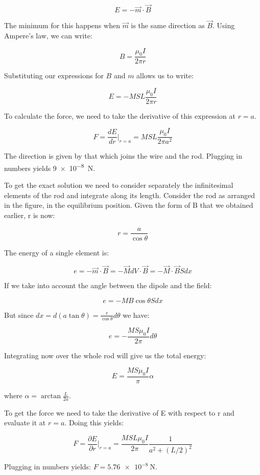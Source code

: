 \[ 
    E = - \vec{m} \cdot \vec{B}
\]

The minimum for this happens when $\vec{m}$ is the same direction as $\vec{B}$.
Using Ampere's law, we can write:

\[ 
    B = \frac{\mu_0 I }{2 \pi r} 
\]

Substituting our expressions for $B$ and $m$ allows us to write:

\[ 
    E = -M S L \frac{\mu_0 I }{2 \pi r} 
\]

To calculate the force, we need to take the derivative of this expression at
$r=a$.

\[ 
    F = \frac{d E}{d r}\big|_{r=a} = MSL \frac{\mu_0 I}{2 \pi a^2}
\]

The direction is given by that which joins the wire and the rod. Plugging in
numbers yields \SI{9e-8}{\newton}.

To get the exact solution we need to consider separately the infinitesimal
elements of the rod and integrate along its length. Consider the rod as
arranged in the figure, in the equilibrium position. Given the form of B that we
obtained earlier, r is now:

\[
    r = \frac{a}{\cos\theta}
\]

The energy of a single element is:

\[ 
    e = - \vec{m}\cdot \vec{B} = -\vec{M} dV \cdot \vec{B} = - \vec{M} \cdot
    \vec{B} S dx
\]

If we take into account the angle between the dipole and the field:

\[ 
    e = -M B \cos\theta S dx 
\]

But since $dx = d(a \tan\theta) = \frac{r}{\cos \theta}d \theta$ we have:

\[ 
    e = - \frac{M S \mu_0 I}{2 \pi} d \theta
\]

Integrating now over the whole rod will give us the total energy:

\[ 
    E = \frac{M S \mu_0 I}{\pi} \alpha 
\]

where $\alpha = \arctan \frac{L}{2 a}$.

To get the force we need to take the derivative of E with respect to r and
evaluate it at $r=a$. Doing this yields:


\[ 
    F = \frac{\partial E}{\partial r}\big|_{r=a} = \frac{M S L \mu_0 I}{2 \pi}
    \frac{1}{a^2 + (L/2)^2}
\]

Plugging in numbers yields: $F = \SI{5.76e-8}{\newton}$.
